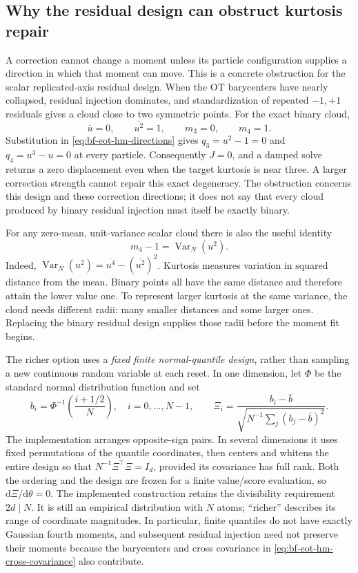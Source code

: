 \subsection{Why the residual design can obstruct kurtosis repair}
\label{sec:bf-eot-hm-richer-design}

A correction cannot change a moment unless its particle configuration supplies
a direction in which that moment can move.  This is a concrete obstruction for
the scalar replicated-axis residual design.  When the OT barycenters have
nearly collapsed, residual injection dominates, and standardization of repeated
\(-1,+1\) residuals gives a cloud close to two symmetric points.  For the exact
binary cloud,
\[
 \overline u=0,\qquad \overline{u^2}=1,\qquad
 m_3=0,\qquad m_4=1.
\]
Substitution in \eqref{eq:bf-eot-hm-directions} gives
\(q_3=u^2-1=0\) and \(q_4=u^3-u=0\) at every particle.
Consequently \(J=0\), and a damped solve returns a zero displacement even when
the target kurtosis is near three.  A larger correction strength cannot repair
this exact degeneracy.  The obstruction concerns this design and these
correction directions; it does not say that every cloud produced by binary
residual injection must itself be exactly binary.

For any zero-mean, unit-variance scalar cloud there is also the useful identity
\begin{equation}
 m_4-1=\operatorname{Var}_{N}(u^2).
 \label{eq:bf-eot-hm-kurtosis-radii}
\end{equation}
Indeed, \(\operatorname{Var}_{N}(u^2)=\overline{u^4}-(\overline{u^2})^2\).
Kurtosis measures variation in squared distance from the mean.  Binary points
all have the same distance and therefore attain the lower value one.  To
represent larger kurtosis at the same variance, the cloud needs different
radii: many smaller distances and some larger ones.  Replacing the binary
residual design supplies those radii before the moment fit begins.

The richer option uses a \emph{fixed finite normal-quantile design}, rather
than sampling a new continuous random variable at each reset.  In one dimension,
let \(\Phi\) be the standard normal distribution function and set
\begin{equation}
 b_i=\Phi^{-1}\!\left(\frac{i+1/2}{N}\right),\quad i=0,\ldots,N-1,
 \qquad
 \Xi_i=\frac{b_i-\bar b}{\sqrt{N^{-1}\sum_j(b_j-\bar b)^2}}.
 \label{eq:bf-eot-hm-normal-quantile-design}
\end{equation}
The implementation arranges opposite-sign pairs.  In several dimensions it
uses fixed permutations of the quantile coordinates, then centers and whitens
the entire design so that \(N^{-1}\Xi^\top\Xi=I_d\), provided its covariance
has full rank.  Both the ordering and the design are frozen for a finite
value/score evaluation, so \(\mathrm d\Xi/\mathrm d\theta=0\).
The implemented construction retains the divisibility requirement \(2d\mid N\).
It is still an empirical distribution with \(N\) atoms; ``richer'' describes
its range of coordinate magnitudes.  In particular, finite quantiles do not
have exactly Gaussian fourth moments, and subsequent residual injection need
not preserve their moments because the barycenters and cross covariance in
\eqref{eq:bf-eot-hm-cross-covariance} also contribute.

